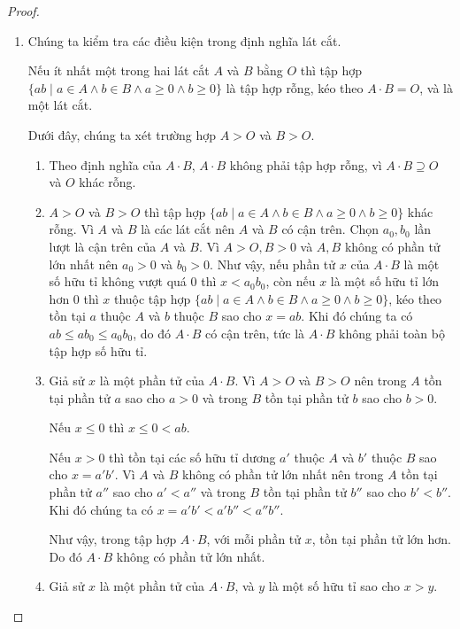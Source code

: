 \begin{proof}
    \begin{enumerate}[label={(\roman*)}]
        \item Chúng ta kiểm tra các điều kiện trong định nghĩa lát cắt.

              Nếu ít nhất một trong hai lát cắt $A$ và $B$ bằng $O$ thì tập hợp $\{ ab \mid a\in A\wedge b\in B\wedge a\geq 0\wedge b\geq 0 \}$ là tập hợp rỗng, kéo theo $A\cdot B = O$, và là một lát cắt.

              Dưới đây, chúng ta xét trường hợp $A > O$ và $B > O$.
              \begin{enumerate}[label={(DC\arabic*)}]
                  \item Theo định nghĩa của $A\cdot B$, $A\cdot B$ không phải tập hợp rỗng, vì $A\cdot B \supseteq O$ và $O$ khác rỗng.
                  \item $A > O$ và $B > O$ thì tập hợp $\{ ab \mid a\in A\wedge b\in B\wedge a\geq 0\wedge b\geq 0 \}$ khác rỗng. Vì $A$ và $B$ là các lát cắt nên $A$ và $B$ có cận trên. Chọn $a_{0}, b_{0}$ lần lượt là cận trên của $A$ và $B$. Vì $A > O, B > 0$ và $A, B$ không có phần tử lớn nhất nên $a_{0} > 0$ và $b_{0} > 0$. Như vậy, nếu phần tử $x$ của $A\cdot B$ là một số hữu tỉ không vượt quá $0$ thì $x < a_{0}b_{0}$, còn nếu $x$ là một số hữu tỉ lớn hơn $0$ thì $x$ thuộc tập hợp $\{ ab \mid a\in A\wedge b\in B\wedge a\geq 0\wedge b\geq 0 \}$, kéo theo tồn tại $a$ thuộc $A$ và $b$ thuộc $B$ sao cho $x = ab$. Khi đó chúng ta có $ab\leq ab_{0} \leq a_{0}b_{0}$, do đó $A\cdot B$ có cận trên, tức là $A\cdot B$ không phải toàn bộ tập hợp số hữu tỉ.
                  \item Giả sử $x$ là một phần tử của $A\cdot B$. Vì $A > O$ và $B > O$ nên trong $A$ tồn tại phần tử $a$ sao cho $a > 0$ và trong $B$ tồn tại phần tử $b$ sao cho $b > 0$.

                        Nếu $x\leq 0$ thì $x\leq 0 < ab$.

                        Nếu $x > 0$ thì tồn tại các số hữu tỉ dương $a'$ thuộc $A$ và $b'$ thuộc $B$ sao cho $x = a'b'$. Vì $A$ và $B$ không có phần tử lớn nhất nên trong $A$ tồn tại phần tử $a''$ sao cho $a' < a''$ và trong $B$ tồn tại phần tử $b''$ sao cho $b' < b''$. Khi đó chúng ta có $x = a'b' < a'b'' < a''b''$.

                        Như vậy, trong tập hợp $A\cdot B$, với mỗi phần tử $x$, tồn tại phần tử lớn hơn. Do đó $A\cdot B$ không có phần tử lớn nhất.
                  \item Giả sử $x$ là một phần tử của $A\cdot B$, và $y$ là một số hữu tỉ sao cho $x > y$.


\end{enumerate}
\end{enumerate}
\end{proof}
